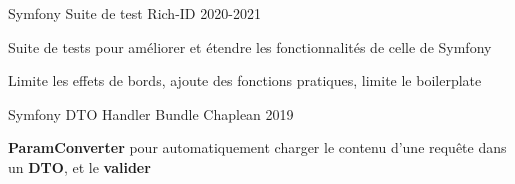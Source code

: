 

\begin{cventries}

  \cventry
    {Symfony}
    {Suite de test}
    {Rich-ID}
    {2020-2021}
    {
      \begin{cvitems} %
        \item {Suite de tests pour améliorer et étendre les fonctionnalités de celle de Symfony}
        \item {Limite les effets de bords, ajoute des fonctions pratiques, limite le boilerplate}
      \end{cvitems}
    }

  \cventry
    {Symfony}
    {DTO Handler Bundle}
    {Chaplean}
    {2019}
    {
      \begin{cvitems} %
        \item {\textbf{ParamConverter} pour automatiquement charger le contenu d'une requête dans un \textbf{DTO}, et le \textbf{valider}}
      \end{cvitems}
    }
    
\end{cventries}
